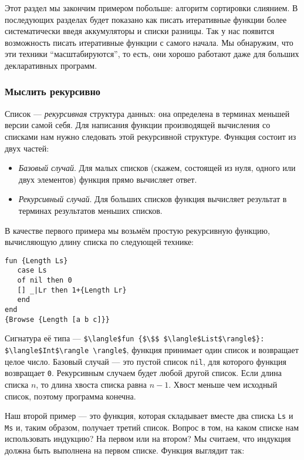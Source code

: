 Этот раздел мы закончим примером побольше: алгоритм сортировки слиянием. В последующих разделах будет показано как писать итеративные функции более систематически введя аккумуляторы и списки разницы. Так у нас появится возможность писать итеративные функции с самого начала. Мы обнаружим, что эти техники ``масштабируются'', то есть, они хорошо работают даже для больших декларативных программ.

\subsubsection{Мыслить рекурсивно}

Список --- \emph{рекурсивная} структура данных: она определена в терминах меньшей версии самой себя. Для написания функции производящей вычисления со списками нам нужно следовать этой рекурсивной структуре. Функция состоит из двух частей:

\begin{itemize}
\item{\emph{Базовый случай}. Для малых списков (скажем, состоящей из нуля, одного или двух элементов) функция прямо вычисляет ответ.}

\item{\emph{Рекурсивный случай}. Для больших списков функция вычисляет результат в терминах результатов меньших списков.}
\end{itemize}

В качестве первого примера мы возьмём простую рекурсивную функцию, вычисляющую длину списка по следующей технике:

\begin{lstlisting}
fun {Length Ls}
   case Ls
   of nil then 0
   [] _|Lr then 1+{Length Lr}
   end
end
{Browse {Length [a b c]}}
\end{lstlisting}

Сигнатура её типа --- \lstinline!$\langle$fun {$\$$ $\langle$List$\rangle$}: $\langle$Int$\rangle \rangle$!, функция принимает один список и возвращает целое число. Базовый случай --- это пустой список \lstinline!nil!, для которого функция возвращает \lstinline!0!. Рекурсивным случаем будет любой другой список. Если длина списка $n$, то длина хвоста списка равна $n-1$. Хвост меньше чем исходный список, поэтому программа конечна.

Наш второй пример --- это функция, которая складывает вместе два списка \lstinline!Ls! и \lstinline!Ms! и, таким образом, получает третий список. Вопрос в том, на каком списке нам использовать индукцию? На первом или на втором? Мы считаем, что индукция должна быть выполнена на первом списке. Функция выглядит так:

